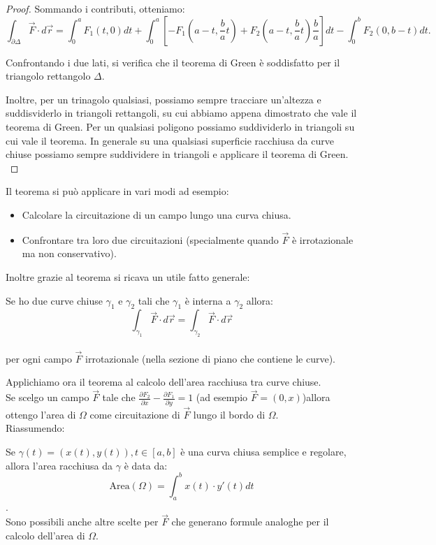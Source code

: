 \begin{proof}
Sommando i contributi, otteniamo:
$$ \int_{\partial \Delta} \vec{F} \cdot d\vec{r} = \int_0^a F_1(t, 0) dt + \int_0^a \left[ -F_1(a - t, \frac{b}{a}t) + F_2(a - t, \frac{b}{a}t)\frac{b}{a} \right] dt - \int_0^b F_2(0, b - t) dt. $$

Confrontando i due lati, si verifica che il teorema di Green è soddisfatto per il triangolo rettangolo $\Delta$.

Inoltre, per un trinagolo qualsiasi, possiamo sempre tracciare un'altezza e suddisviderlo in triangoli rettangoli, su cui abbiamo appena dimostrato che vale il teorema di Green. Per un qualsiasi poligono possiamo suddividerlo in triangoli su cui vale il teorema. In generale su una qualsiasi superficie racchiusa da curve chiuse possiamo sempre suddividere in triangoli e applicare il teorema di Green.\\
\end{proof}

Il teorema si può applicare in vari modi ad esempio:
\begin{itemize}
\item Calcolare la circuitazione di un campo lungo una curva chiusa.
\item Confrontare tra loro due circuitazioni (specialmente quando $\vec F$ è irrotazionale ma non conservativo).
\end{itemize}

Inoltre grazie al teorema si ricava un utile fatto generale:
\begin{corollario}{}
  Se ho due curve chiuse $\gamma_1$ e $\gamma_2$ tali che $\gamma_1$ è interna a $\gamma_2$ allora: $$\int_{\gamma_1} \vec F \cdot d\vec r = \int_{\gamma_2} \vec F \cdot d\vec r$$\\
  per ogni campo $\vec F$ irrotazionale (nella sezione di piano che contiene le curve).
\end{corollario}

Applichiamo ora il teorema al calcolo dell'area racchiusa tra curve chiuse.\\
Se scelgo un campo $\vec F$ tale che $\frac{\partial F_2}{\partial x}-\frac{\partial F_1}{\partial y}=1$ (ad esempio $\vec F = (0,x)$)allora ottengo l'area di $\Omega$ come circuitazione di $\vec F$ lungo il bordo di $\Omega$.\\
Riassumendo:
\begin{teorema}{}
  Se $\gamma(t)= (x(t), y(t)), t \in [a,b]$ è una curva chiusa semplice e regolare, allora l'area racchiusa da $\gamma$ è data da:
  $$\text{Area}(\Omega) = \int_{a}^{b} x(t)\cdot y'(t) dt$$.\\
  Sono possibili anche altre scelte per $\vec F$ che generano formule analoghe per il calcolo dell'area di $\Omega$.
\end{teorema}

